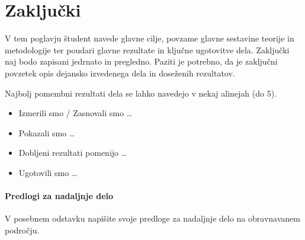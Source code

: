 \chapter{Zaključki}\label{cha:zakljucki}
V tem poglavju študent navede glavne cilje, povzame glavne sestavine teorije in metodologije ter poudari glavne rezultate in ključne ugotovitve dela. Zaključki naj bodo zapisani jedrnato in pregledno. Paziti je potrebno, da je zaključni povzetek opis dejansko izvedenega dela in doseženih rezultatov.

Najbolj pomembni rezultati dela se lahko navedejo v nekaj alinejah (do 5).
\begin{itemize}
\item Izmerili smo / Zasnovali smo \ldots
\item Pokazali smo \ldots
\item Dobljeni rezultati pomenijo \ldots
\item Ugotovili smo \ldots
\end{itemize}

\subsubsection{Predlogi za nadaljnje delo}
V posebnem odstavku napišite svoje predloge za nadaljnje delo na obravnavanem področju.
